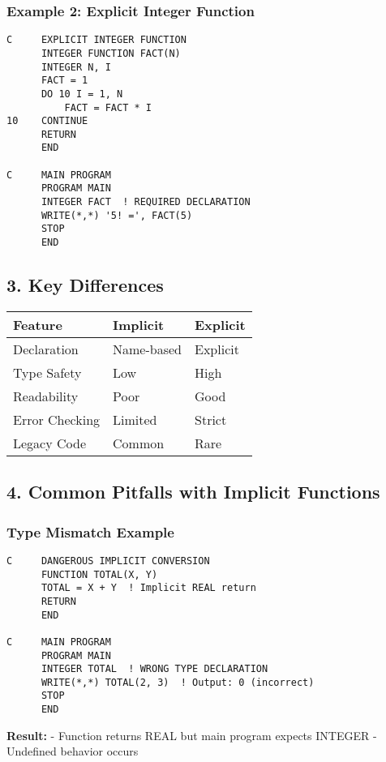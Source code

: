 \documentclass{book}
\begin{document}
\subsubsection*{Example 2: Explicit Integer Function}
\begin{verbatim}
C     EXPLICIT INTEGER FUNCTION
      INTEGER FUNCTION FACT(N)
      INTEGER N, I
      FACT = 1
      DO 10 I = 1, N
          FACT = FACT * I
10    CONTINUE
      RETURN
      END

C     MAIN PROGRAM
      PROGRAM MAIN
      INTEGER FACT  ! REQUIRED DECLARATION
      WRITE(*,*) '5! =', FACT(5)
      STOP
      END
\end{verbatim}

\subsection*{3. Key Differences}
\begin{center}
\begin{tabular}{|l|l|l|}
\hline
\textbf{Feature} & \textbf{Implicit} & \textbf{Explicit} \\ 
\hline
Declaration & Name-based & Explicit \\
Type Safety & Low & High \\
Readability & Poor & Good \\
Error Checking & Limited & Strict \\
Legacy Code & Common & Rare \\
\hline
\end{tabular}
\end{center}

\subsection*{4. Common Pitfalls with Implicit Functions}
\subsubsection*{Type Mismatch Example}
\begin{verbatim}
C     DANGEROUS IMPLICIT CONVERSION
      FUNCTION TOTAL(X, Y)
      TOTAL = X + Y  ! Implicit REAL return
      RETURN
      END

C     MAIN PROGRAM
      PROGRAM MAIN
      INTEGER TOTAL  ! WRONG TYPE DECLARATION
      WRITE(*,*) TOTAL(2, 3)  ! Output: 0 (incorrect)
      STOP
      END
\end{verbatim}
\textbf{Result:}
- Function returns REAL but main program expects INTEGER
- Undefined behavior occurs
\end{document}
